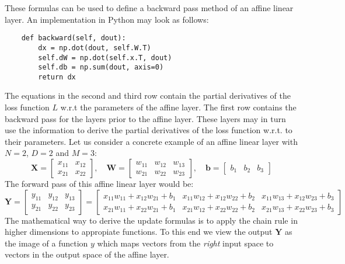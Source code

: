 \documentclass{article}
\begin{document}
\vspace{0.2cm}
\noindent
These formulas can be used to define a backward pass method of an affine linear layer. An implementation
in Python may look as follows:
\begin{verbatim}
    def backward(self, dout):
        dx = np.dot(dout, self.W.T)
        self.dW = np.dot(self.x.T, dout) 
        self.db = np.sum(dout, axis=0)
        return dx
\end{verbatim}
\noindent 
The equations in the second and third row contain the partial derivatives of the loss function \(L\) 
w.r.t the parameters of the affine layer. The first row contains the backward pass for 
the layers prior to the affine layer. These layers may in turn use the information to derive the
partial derivatives of the loss function w.r.t. to their parameters.
\vspace{0.1cm}
\noindent
Let us consider a concrete example of an affine linear layer with \(N = 2 \), \(D = 2\) and \(M = 3\):
    \[
    \mathbf{X} = \begin{bmatrix}
    x_{11} & x_{12} \\
    x_{21} & x_{22}
    \end{bmatrix}, \quad \mathbf{W} = \begin{bmatrix}
    w_{11} & w_{12} & w_{13} \\
    w_{21} & w_{22} & w_{23}
    \end{bmatrix}, \quad \mathbf{b} = \begin{bmatrix}
    b_1 & b_2 & b_3
    \end{bmatrix}
    \]
The forward pass of this affine linear layer would be:
    \[
    \mathbf{Y} = \begin{bmatrix}
        y_{11} & y_{12} & y_{13} \\
        y_{21} & y_{22} & y_{23}
        \end{bmatrix} = \begin{bmatrix}
        x_{11}w_{11} + x_{12}w_{21} + b_{1} & x_{11}w_{12} + x_{12}w_{22} + b_{2} & x_{11}w_{13} + x_{12}w_{23} + b_{3} \\
        x_{21}w_{11} + x_{22}w_{21} + b_{1} & x_{21}w_{12} + x_{22}w_{22} + b_{2} & x_{21}w_{13} + x_{22}w_{23} + b_{3}
        \end{bmatrix}
    \]
The mathematical way to derive the update formulas is to apply the chain rule in higher dimensions 
to appropiate functions. To this end we view the output \(\mathbf{Y}\) as the image of a function 
\(y\) which maps vectors from the \textit{right} input space to vectors in the output space of the 
affine layer.
\end{document}

